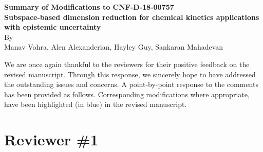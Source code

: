 \documentclass[11pt,final]{article}
\begin{document}
\begin{center}
{\bf Summary of Modifications to CNF-D-18-00757}\\[6pt]
{\bf Subspace-based dimension reduction for chemical kinetics applications with 
epistemic uncertainty}\\[6pt]
By \\
Manav Vohra, Alen Alexanderian, Hayley Guy, Sankaran Mahadevan 
\end{center}



\vspace*{1in}

We are once again thankful to the reviewers for their positive feedback on the revised 
manuscript. Through this response, we sincerely hope to have addressed the
outstanding issues and concerns. 
A point-by-point
response to the comments has been provided as follows. Corresponding modifications
where appropriate, have been highlighted (in blue) in the revised manuscript. 

\clearpage


\section*{Reviewer \#1}
\end{document}
